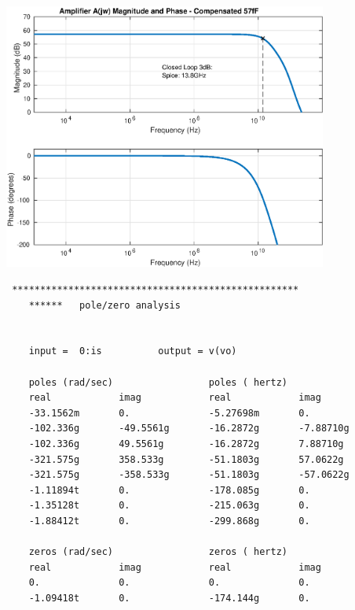 \documentclass[12pt,a4paper]{article}
\begin{document}
{\centering
	\includegraphics[width=0.8\textwidth]{plots/part_j_a.eps}
\par}

\begin{verbatim}
 ***************************************************
    ******   pole/zero analysis


    input =  0:is          output = v(vo)

    poles (rad/sec)                 poles ( hertz)
    real            imag            real            imag
    -33.1562m       0.              -5.27698m       0.
    -102.336g       -49.5561g       -16.2872g       -7.88710g
    -102.336g       49.5561g        -16.2872g       7.88710g
    -321.575g       358.533g        -51.1803g       57.0622g
    -321.575g       -358.533g       -51.1803g       -57.0622g
    -1.11894t       0.              -178.085g       0.
    -1.35128t       0.              -215.063g       0.
    -1.88412t       0.              -299.868g       0.

    zeros (rad/sec)                 zeros ( hertz)
    real            imag            real            imag
    0.              0.              0.              0.
    -1.09418t       0.              -174.144g       0.
\end{verbatim}

\pagebreak



\pagebreak

\end{document}
